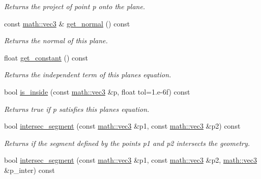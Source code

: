 \begin{DoxyCompactItemize}
\begin{DoxyCompactList}\small\item\em Returns the project of point {\itshape p} onto the plane. \end{DoxyCompactList}\item 
\mbox{\label{classphysim_1_1geometry_1_1plane_aeb4782478c6c2497e9bef3c41b4f8be6}} 
const \hyperlink{structphysim_1_1math_1_1vec3}{math\+::vec3} \& \hyperlink{classphysim_1_1geometry_1_1plane_aeb4782478c6c2497e9bef3c41b4f8be6}{get\+\_\+normal} () const
\begin{DoxyCompactList}\small\item\em Returns the normal of this plane. \end{DoxyCompactList}\item 
\mbox{\label{classphysim_1_1geometry_1_1plane_a917b365db5347521a10d5978da5ae1e5}} 
float \hyperlink{classphysim_1_1geometry_1_1plane_a917b365db5347521a10d5978da5ae1e5}{get\+\_\+constant} () const
\begin{DoxyCompactList}\small\item\em Returns the independent term of this plane\textquotesingle{}s equation. \end{DoxyCompactList}\item 
bool \hyperlink{classphysim_1_1geometry_1_1plane_ad5e112588680a3668cc8b93e9c880d9a}{is\+\_\+inside} (const \hyperlink{structphysim_1_1math_1_1vec3}{math\+::vec3} \&p, float tol=1.e-\/6f) const
\begin{DoxyCompactList}\small\item\em Returns true if {\itshape p} satisfies this plane\textquotesingle{}s equation. \end{DoxyCompactList}\item 
bool \hyperlink{classphysim_1_1geometry_1_1plane_a752f1e6507b64a61f20c63f1d49163d8}{intersec\+\_\+segment} (const \hyperlink{structphysim_1_1math_1_1vec3}{math\+::vec3} \&p1, const \hyperlink{structphysim_1_1math_1_1vec3}{math\+::vec3} \&p2) const
\begin{DoxyCompactList}\small\item\em Returns if the segment defined by the points {\itshape p1} and {\itshape p2} intersects the geometry. \end{DoxyCompactList}\item 
bool \hyperlink{classphysim_1_1geometry_1_1plane_a55f32721f69fd6606c594f2caceb4689}{intersec\+\_\+segment} (const \hyperlink{structphysim_1_1math_1_1vec3}{math\+::vec3} \&p1, const \hyperlink{structphysim_1_1math_1_1vec3}{math\+::vec3} \&p2, \hyperlink{structphysim_1_1math_1_1vec3}{math\+::vec3} \&p\+\_\+inter) const

\end{DoxyCompactItemize}
